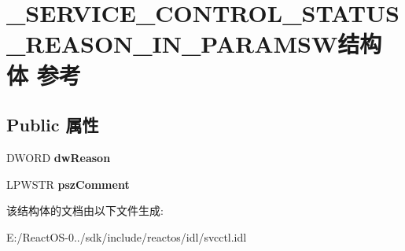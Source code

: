 \hypertarget{struct___s_e_r_v_i_c_e___c_o_n_t_r_o_l___s_t_a_t_u_s___r_e_a_s_o_n___i_n___p_a_r_a_m_s_w}{}\section{\+\_\+\+S\+E\+R\+V\+I\+C\+E\+\_\+\+C\+O\+N\+T\+R\+O\+L\+\_\+\+S\+T\+A\+T\+U\+S\+\_\+\+R\+E\+A\+S\+O\+N\+\_\+\+I\+N\+\_\+\+P\+A\+R\+A\+M\+S\+W结构体 参考}
\label{struct___s_e_r_v_i_c_e___c_o_n_t_r_o_l___s_t_a_t_u_s___r_e_a_s_o_n___i_n___p_a_r_a_m_s_w}
\subsection*{Public 属性}
\begin{DoxyCompactItemize}
\item 
\mbox{\label{struct___s_e_r_v_i_c_e___c_o_n_t_r_o_l___s_t_a_t_u_s___r_e_a_s_o_n___i_n___p_a_r_a_m_s_w_a1ee79af409bb1adf16287d2be2cec606}} 
D\+W\+O\+RD {\bfseries dw\+Reason}
\item 
\mbox{\label{struct___s_e_r_v_i_c_e___c_o_n_t_r_o_l___s_t_a_t_u_s___r_e_a_s_o_n___i_n___p_a_r_a_m_s_w_a6316475e42286ff1deec245afadfdd55}} 
L\+P\+W\+S\+TR {\bfseries psz\+Comment}
\end{DoxyCompactItemize}


该结构体的文档由以下文件生成\+:\begin{DoxyCompactItemize}
\item 
E\+:/\+React\+O\+S-\/0../sdk/include/reactos/idl/svcctl.\+idl\end{DoxyCompactItemize}
